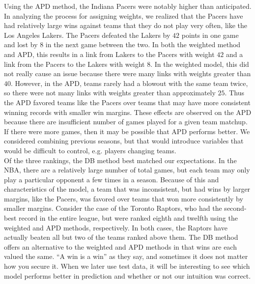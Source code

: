 \documentclass[12pt]{article}%
\begin{document}
\null\quad\quad Using the APD method, the Indiana Pacers were notably higher than anticipated. In analyzing the process for assigning weights, we realized that the Pacers have had relatively large wins against teams that they do not play very often, like the Los Angeles Lakers. The Pacers defeated the Lakers by $42$ points in one game and lost by $8$ in the next game between the two. In both the weighted method and APD, this results in a link from Lakers to the Pacers with weight $42$ and a link from the Pacers to the Lakers with weight $8$. In the weighted model, this did not really cause an issue because there were many links with weights greater than $40$. However, in the APD, teams rarely had a blowout with the same team twice, so there were not many links with weights greater than approximately $25$. Thus the APD favored teams like the Pacers over teams that may have more consistent winning records with smaller win margins. These effects are observed on the APD because there are insufficient number of games played for a given team matchup. If there were more games, then it may be possible that APD performs better. We considered combining previous seasons, but that would introduce variables that would be difficult to control, e.g. players changing teams.\\
\null\quad\quad Of the three rankings, the DB method best matched our expectations. In the NBA, there are a relatively large number of total games, but each team may only play a particular opponent a few times in a season. Because of this and characteristics of the model, a team that was inconsistent, but had wins by larger margins, like the Pacers, was favored over teams that won more consistently by smaller margins. Consider the case of the Toronto Raptors, who had the second-best record in the entire league, but were ranked eighth and twelfth using the weighted and APD methods, respectively. In both cases, the Raptors have actually beaten all but two of the teams ranked above them. The DB method offers an alternative to the weighted and APD methods in that wins are each valued the same. ``A win is a win'' as they say, and sometimes it does not matter how you secure it. When we later use test data, it will be interesting to see which model performs better in prediction and whether or not our intuition was correct.\\
\end{document}
